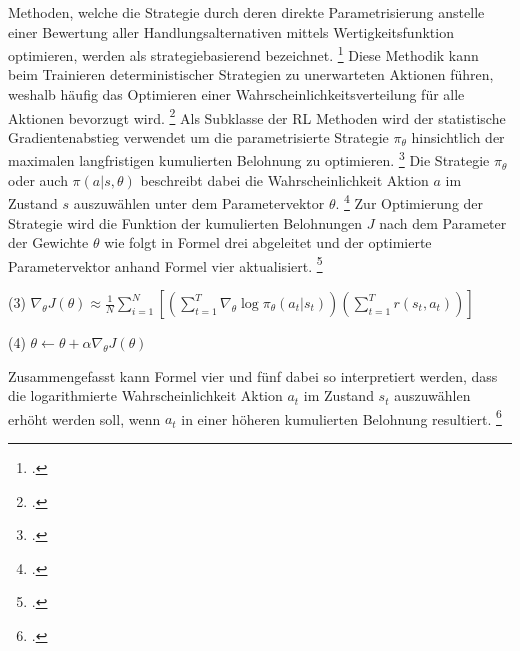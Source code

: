 Methoden, welche die Strategie durch deren direkte Parametrisierung anstelle einer Bewertung aller Handlungsalternativen mittels Wertigkeitsfunktion optimieren, werden als strategiebasierend bezeichnet. \footcite[Vgl.][S. 2]{Zhang.2018}
Diese Methodik kann beim Trainieren deterministischer Strategien zu unerwarteten Aktionen führen, weshalb häufig das Optimieren einer Wahrscheinlichkeitsverteilung für alle Aktionen bevorzugt wird. \footcite[Vgl.][S. 3]{Ningombam.2022}
Als Subklasse der RL Methoden wird der statistische Gradientenabstieg verwendet um die parametrisierte Strategie $\pi_{\theta}$ hinsichtlich der maximalen langfristigen kumulierten Belohnung zu optimieren. \footcite[Vgl.][S. 3]{Ningombam.2022}
Die Strategie $\pi_{\theta}$ oder auch $\pi(a|s,\theta)$ beschreibt dabei die Wahrscheinlichkeit Aktion $a$ im Zustand $s$ auszuwählen unter dem Parametervektor $\theta$. \footcite[Vgl.][S. 321]{Sutton.2018}
Zur Optimierung der Strategie wird die Funktion der kumulierten Belohnungen $J$ nach dem Parameter der Gewichte $\theta$ wie folgt in Formel drei abgeleitet und der optimierte Parametervektor anhand Formel vier aktualisiert. \footcite[Vgl.][S. 6]{Wang.2020}
\begin{description}
    \item \begin{center} (3) $\nabla_{\theta}J(\theta) \approx \frac{1}{N} \sum \limits_{i=1}^{N} \left[(\sum \limits_{t=1}^{T} \nabla_{\theta}\log\pi_{\theta}(a_{t}|s_{t}))(\sum \limits_{t=1}^{T} r(s_{t},a_{t}))\right]$ \end{center}
    \item \begin{center} (4) $\theta \leftarrow \theta + \alpha\nabla_{\theta}J(\theta)$ \end{center}
\end{description}
Zusammengefasst kann Formel vier und fünf dabei so interpretiert werden, dass die logarithmierte Wahrscheinlichkeit Aktion $a_{t}$ im Zustand $s_{t}$ auszuwählen erhöht werden soll, wenn $a_{t}$ in einer höheren kumulierten Belohnung resultiert. \footcite[Vgl.][S. 6]{Wang.2020}

